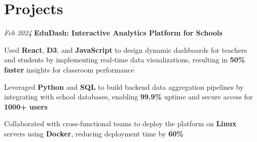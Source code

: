 \section{Projects}

\begin{twocolentry}{
    \textit{Feb 2024}
}{
    \textbf{EduDash: Interactive Analytics Platform for Schools}
}
\end{twocolentry}
\begin{onecolentry}
    \begin{highlights}
        \item Used \textbf{React}, \textbf{D3}, and \textbf{JavaScript} to design dynamic dashboards for teachers and students by implementing real-time data visualizations, resulting in \textbf{50\% faster} insights for classroom performance
        \item Leveraged \textbf{Python} and \textbf{SQL} to build backend data aggregation pipelines by integrating with school databases, enabling \textbf{99.9\%} uptime and secure access for \textbf{1000+ users}
        \item Collaborated with cross-functional teams to deploy the platform on \textbf{Linux} servers using \textbf{Docker}, reducing deployment time by \textbf{60\%}
    \end{highlights}
\end{onecolentry}
